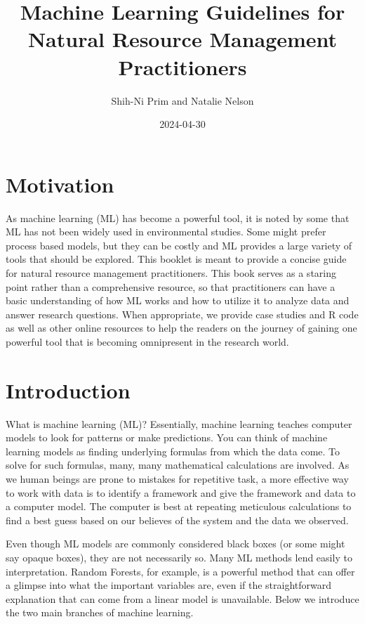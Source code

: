 \documentclass[
]{book}
\title{Machine Learning Guidelines for Natural Resource Management Practitioners}
\author{Shih-Ni Prim and Natalie Nelson}
\date{2024-04-30}
\begin{document}
\maketitle

{
\setcounter{tocdepth}{1}
\tableofcontents
}
\hypertarget{motivation}{%
\chapter{Motivation}\label{motivation}}

As machine learning (ML) has become a powerful tool, it is noted by some that ML has not been widely used in environmental studies. Some might prefer process based models, but they can be costly and ML provides a large variety of tools that should be explored. This booklet is meant to provide a concise guide for natural resource management practitioners. This book serves as a staring point rather than a comprehensive resource, so that practitioners can have a basic understanding of how ML works and how to utilize it to analyze data and answer research questions. When appropriate, we provide case studies and R code as well as other online resources to help the readers on the journey of gaining one powerful tool that is becoming omnipresent in the research world.

\hypertarget{intro}{%
\chapter{Introduction}\label{intro}}

What is machine learning (ML)? Essentially, machine learning teaches computer models to look for patterns or make predictions. You can think of machine learning models as finding underlying formulas from which the data come. To solve for such formulas, many, many mathematical calculations are involved. As we human beings are prone to mistakes for repetitive task, a more effective way to work with data is to identify a framework and give the framework and data to a computer model. The computer is best at repeating meticulous calculations to find a best guess based on our believes of the system and the data we observed.

Even though ML models are commonly considered black boxes (or some might say opaque boxes), they are not necessarily so. Many ML methods lend easily to interpretation. Random Forests, for example, is a powerful method that can offer a glimpse into what the important variables are, even if the straightforward explanation that can come from a linear model is unavailable. Below we introduce the two main branches of machine learning.
\end{document}
